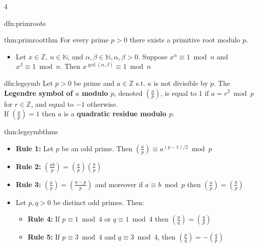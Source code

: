 \documentclass[landscape, 8pt]{extarticle}
\begin{document}
\begin{multicols*}{4}
\begin{dfn}{dfn:primroots}{ }
		\end{dfn}
		
		
		\begin{thm}{thm:primrootthm}{ }
			For every prime $p > 0$ there exists a primitive root modulo $p$.
			\begin{itemize}
				\item Let $x\in \mathbb{Z}$, $n\in \mathbb{N}$, and $\alpha, \beta\in \mathbb{N}, \alpha, \beta > 0$. Suppose $x^\alpha \equiv 1 \bmod{n}$ and $x^\beta \equiv 1 \bmod{n}$. Then $x^{\gcd(\alpha, \beta)} \equiv 1 \bmod{n}$
			\end{itemize}
			
		\end{thm}
		
		
		\begin{mdfn}{dfn:legsymb}{ }
			Let $p>0$ be prime and $a\in \mathbb{Z}$ s.t. $a$ is not divisible by $p$. The \textbf{Legendre symbol of $a$ modulo $p$}, denoted $(\frac{a}{p})$, is equal to $1$ if $a = r^2 \bmod{p}$ for $r\in \mathbb{Z}$, and equal to $-1$ otherwise.\\
			If $(\frac{a}{p}) = 1$ then $a$ is a \textbf{quadratic residue modulo $p$}.
			
		\end{mdfn}
		
		
		\begin{thm}{thm:legsymbthms}{ }
			\begin{itemize}
				\item \textbf{Rule 1:} Let $p$ be an odd prime. Then $(\frac{a}{p}) \equiv a^{(p-1)/2} \bmod{p}$
				\item \textbf{Rule 2:} $(\frac{ab}{p}) = (\frac{a}{p})(\frac{b}{p})$
				\item \textbf{Rule 3:} $(\frac{a}{p}) = (\frac{a-p}{p})$ and moreover if $a \equiv b \bmod{p}$ then $(\frac{a}{p}) = (\frac{b}{p})$
				\item Let $p, q > 0$ be distinct odd primes. Then:
				\begin{itemize}
					\item \textbf{Rule 4:} If $p\equiv 1 \bmod{4}$ or $q \equiv 1 \bmod{4}$ then $(\frac{p}{q}) = (\frac{q}{p})$
					\item \textbf{Rule 5:} If $p \equiv 3 \bmod{4}$ and $q \equiv 3 \bmod{4}$, then $(\frac{p}{q}) = -(\frac{q}{p})$ 
				\end{itemize}
			\end{itemize}
			

\end{thm}
\end{multicols*}
\end{document}
